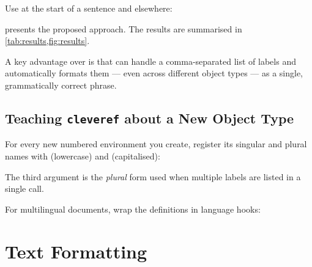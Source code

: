 Use \latexinline{\Cref} at the start of a sentence and \latexinline{\cref} elsewhere:
\begin{latexcode}
 presents the proposed approach.
The results are summarised in \cref{tab:results,fig:results}.
\end{latexcode}

A key advantage over \latexinline{\autoref} is that \latexinline{\cref} can handle a
comma-separated list of labels and automatically formats them — even across different
object types — as a single, grammatically correct phrase.


\subsection{Teaching \texttt{cleveref} about a New Object Type}
\label{sub:cref_new_type}

For every new numbered environment you create, register its singular and plural names
with \latexinline{\crefname} (lowercase) and \latexinline{\Crefname} (capitalised):

\begin{latexcode}

\end{latexcode}

The third argument is the \emph{plural} form used when multiple labels are listed in
a single  call.

For multilingual documents, wrap the definitions in language hooks:
\begin{latexcode}
\addto{}
\addto{}
\end{latexcode}


\section{Text Formatting}
\label{sec:text_formatting}


